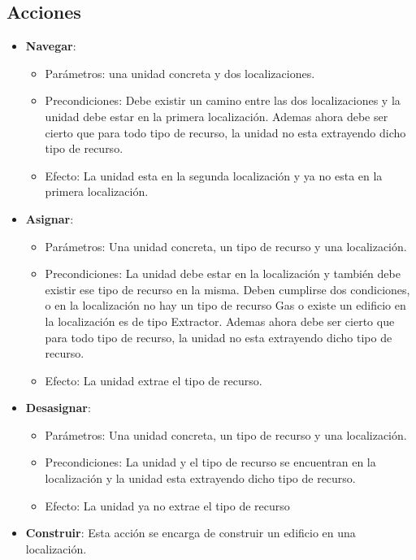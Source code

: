 \subsection{Acciones}
\begin{itemize}
   \item \textbf{Navegar}:
      \begin{itemize}
         \item Parámetros: una unidad concreta y dos localizaciones.
         \item Precondiciones: Debe existir un camino entre las dos localizaciones y la unidad debe estar en la primera localización. Ademas ahora debe ser cierto que para todo tipo de recurso, la unidad no esta extrayendo dicho tipo de recurso.
         \item Efecto: La unidad esta en la segunda localización y ya no esta en la primera localización.
      \end{itemize}
   \item \textbf{Asignar}:
      \begin{itemize}
         \item Parámetros: Una unidad concreta, un tipo de recurso y una localización.
         \item Precondiciones: La unidad debe estar en la localización y también debe existir ese tipo de recurso en la misma. Deben cumplirse dos condiciones, o en la localización no hay un tipo de recurso Gas o existe un edificio en la localización es de tipo Extractor. Ademas ahora debe ser cierto que para todo tipo de recurso, la unidad no esta extrayendo dicho tipo de recurso.
         \item Efecto: La unidad extrae el tipo de recurso.
      \end{itemize}
   \item \textbf{Desasignar}:
         \begin{itemize}
            \item Parámetros: Una unidad concreta, un tipo de recurso y una localización.
            \item Precondiciones: La unidad y el tipo de recurso se encuentran en la localización y la unidad esta extrayendo dicho tipo de recurso.
            \item Efecto: La unidad ya no extrae el tipo de recurso
         \end{itemize}
   \item \textbf{Construir}: Esta acción se encarga de construir un edificio en una localización.
      \begin{itemize}

\end{itemize}
\end{itemize}
